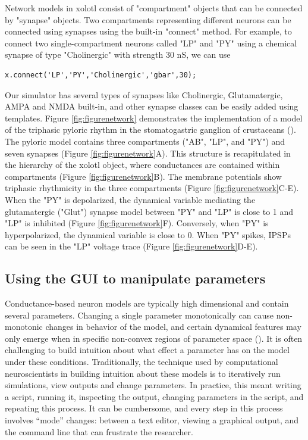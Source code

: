 \documentclass{frontiersSCNS} %
\begin{document}
Network models in xolotl consist of "compartment" objects that can be connected by "synapse" objects. Two compartments representing different neurons can be connected using synapses using the built-in "connect" method. For example, to connect two single-compartment neurons called "LP" and "PY" using a chemical synapse of type "Cholinergic" with strength 30 nS, we can use

\begin{lstlisting}[style=Matlab-editor]
x.connect('LP','PY','Cholinergic','gbar',30); 
\end{lstlisting}

Our simulator has several types of synapses like Cholinergic, Glutamatergic, AMPA and NMDA built-in, and other synapse classes can be easily added using templates. Figure \ref{fig:figurenetwork} demonstrates the implementation of a model of the triphasic pyloric rhythm in the stomatogastric ganglion of crustaceans (\cite{prinzSimilarNetworkActivity2004}). The pyloric model contains three compartments ("AB", "LP", and "PY") and seven synapses (Figure \ref{fig:figurenetwork}A). This structure is recapitulated in the hierarchy of the xolotl object, where conductances are contained within compartments (Figure \ref{fig:figurenetwork}B). The membrane potentials show triphasic rhythmicity in the three compartments (Figure \ref{fig:figurenetwork}C-E). When the "PY" is depolarized, the dynamical variable mediating the  glutamatergic ("Glut") synapse model between "PY" and "LP" is close to 1 and "LP" is inhibited (Figure \ref{fig:figurenetwork}F). Conversely, when "PY" is hyperpolarized, the dynamical variable is close to 0. When "PY" spikes, IPSPs can be seen in the "LP" voltage trace (Figure \ref{fig:figurenetwork}D-E). 



%
%
%
%
%
%

\subsection{Using the GUI to manipulate parameters}

Conductance-based neuron models are typically high dimensional and contain several parameters. Changing a single parameter monotonically can cause non-monotonic changes in behavior of the model, and certain dynamical features may only emerge when in specific non-convex regions of parameter space (\cite{golowasch2002failure}). It is often challenging to build intuition about what effect a parameter has on the model under these conditions. Traditionally, the technique used by computational neuroscientists in building intuition about these models is to iteratively run simulations, view outputs and change parameters. In practice, this meant writing a script, running it, inspecting the output, changing parameters in the script, and repeating this process. It can be cumbersome, and every step in this process involves ``mode'' changes: between a text editor, viewing a graphical output, and the command line that can frustrate the researcher. 
\end{document}

